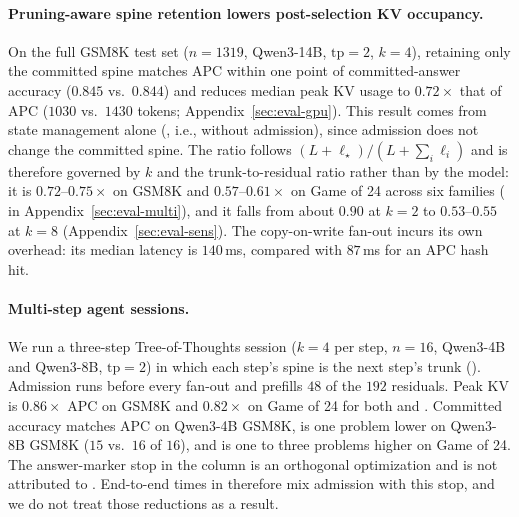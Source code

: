 \paragraph{Pruning-aware spine retention lowers post-selection KV occupancy.}
On the full GSM8K test set ($n{=}1319$, Qwen3-14B, $\mathrm{tp}{=}2$, $k{=}4$), retaining only the committed spine matches APC within one point of committed-answer accuracy ($0.845$ vs.\ $0.844$) and reduces median peak KV usage to $0.72\times$ that of APC ($1030$ vs.\ $1430$ tokens; Appendix~\ref{sec:eval-gpu}).
This result comes from state management alone (\cowonly, i.e., \sys without admission), since admission does not change the committed spine.
The ratio follows $(L+\ell_\star)/(L+\sum_i\ell_i)$ and is therefore governed by $k$ and the trunk-to-residual ratio rather than by the model: it is $0.72$--$0.75\times$ on GSM8K and $0.57$--$0.61\times$ on Game of 24 across six families ( in Appendix~\ref{sec:eval-multi}), and it falls from about $0.90$ at $k{=}2$ to $0.53$--$0.55$ at $k{=}8$ (Appendix~\ref{sec:eval-sens}).
The copy-on-write fan-out incurs its own overhead: its median latency is $140$\,ms, compared with $87$\,ms for an APC hash hit.

\paragraph{Multi-step agent sessions.}
We run a three-step Tree-of-Thoughts session ($k{=}4$ per step, $n{=}16$, Qwen3-4B and Qwen3-8B, $\mathrm{tp}{=}2$) in which each step's spine is the next step's trunk ().
Admission runs before every fan-out and prefills $48$ of the $192$ residuals.
Peak KV is $0.86\times$ APC on GSM8K and $0.82\times$ on Game of 24 for both \cowonly and \sys.
Committed accuracy matches APC on Qwen3-4B GSM8K, is one problem lower on Qwen3-8B GSM8K ($15$ vs.\ $16$ of $16$), and is one to three problems higher on Game of 24.
The answer-marker stop in the \sys column is an orthogonal optimization and is not attributed to \sys.
End-to-end times in  therefore mix admission with this stop, and we do not treat those reductions as a \sys result.

